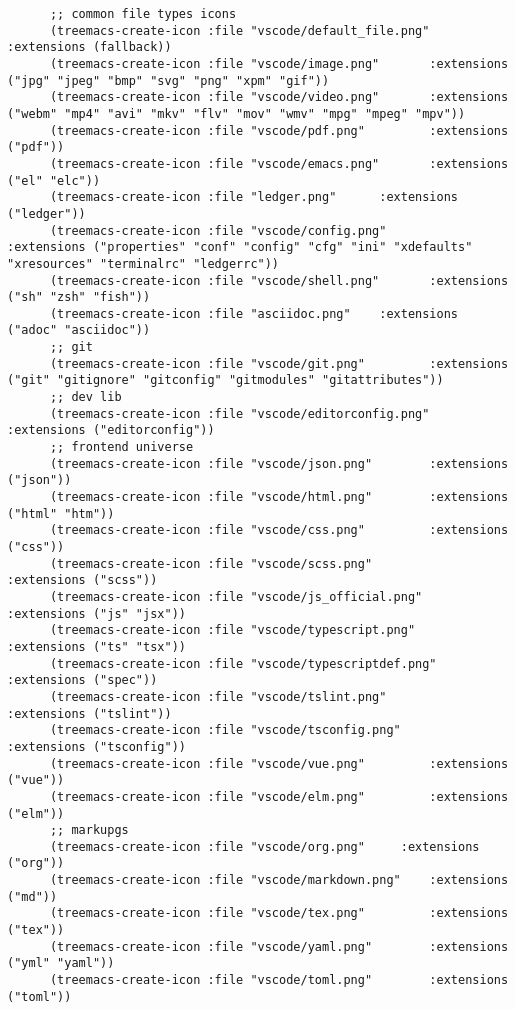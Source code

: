 \documentclass[11pt]{article}
\begin{document}
\begin{verbatim}
      ;; common file types icons
      (treemacs-create-icon :file "vscode/default_file.png"         :extensions (fallback))
      (treemacs-create-icon :file "vscode/image.png"       :extensions ("jpg" "jpeg" "bmp" "svg" "png" "xpm" "gif"))
      (treemacs-create-icon :file "vscode/video.png"       :extensions ("webm" "mp4" "avi" "mkv" "flv" "mov" "wmv" "mpg" "mpeg" "mpv"))
      (treemacs-create-icon :file "vscode/pdf.png"         :extensions ("pdf"))
      (treemacs-create-icon :file "vscode/emacs.png"       :extensions ("el" "elc"))
      (treemacs-create-icon :file "ledger.png"      :extensions ("ledger"))
      (treemacs-create-icon :file "vscode/config.png"        :extensions ("properties" "conf" "config" "cfg" "ini" "xdefaults" "xresources" "terminalrc" "ledgerrc"))
      (treemacs-create-icon :file "vscode/shell.png"       :extensions ("sh" "zsh" "fish"))
      (treemacs-create-icon :file "asciidoc.png"    :extensions ("adoc" "asciidoc"))
      ;; git
      (treemacs-create-icon :file "vscode/git.png"         :extensions ("git" "gitignore" "gitconfig" "gitmodules" "gitattributes"))
      ;; dev lib
      (treemacs-create-icon :file "vscode/editorconfig.png"         :extensions ("editorconfig"))
      ;; frontend universe
      (treemacs-create-icon :file "vscode/json.png"        :extensions ("json"))
      (treemacs-create-icon :file "vscode/html.png"        :extensions ("html" "htm"))
      (treemacs-create-icon :file "vscode/css.png"         :extensions ("css"))
      (treemacs-create-icon :file "vscode/scss.png"         :extensions ("scss"))
      (treemacs-create-icon :file "vscode/js_official.png"          :extensions ("js" "jsx"))
      (treemacs-create-icon :file "vscode/typescript.png"          :extensions ("ts" "tsx"))
      (treemacs-create-icon :file "vscode/typescriptdef.png"          :extensions ("spec"))
      (treemacs-create-icon :file "vscode/tslint.png"          :extensions ("tslint"))
      (treemacs-create-icon :file "vscode/tsconfig.png"          :extensions ("tsconfig"))
      (treemacs-create-icon :file "vscode/vue.png"         :extensions ("vue"))
      (treemacs-create-icon :file "vscode/elm.png"         :extensions ("elm"))
      ;; markupgs
      (treemacs-create-icon :file "vscode/org.png"     :extensions ("org"))
      (treemacs-create-icon :file "vscode/markdown.png"    :extensions ("md"))
      (treemacs-create-icon :file "vscode/tex.png"         :extensions ("tex"))
      (treemacs-create-icon :file "vscode/yaml.png"        :extensions ("yml" "yaml"))
      (treemacs-create-icon :file "vscode/toml.png"        :extensions ("toml"))

\end{verbatim}
\end{document}
